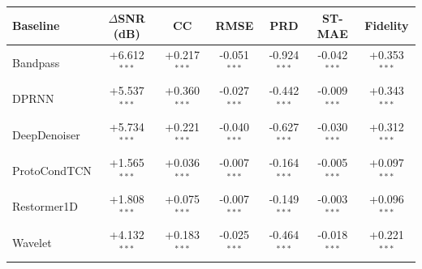 \begin{tabular}{lcccccc}
\toprule
Baseline & $\Delta$SNR (dB) & CC & RMSE & PRD & ST-MAE & Fidelity \\
\midrule
Bandpass & +6.612$^{***}$ & +0.217$^{***}$ & -0.051$^{***}$ & -0.924$^{***}$ & -0.042$^{***}$ & +0.353$^{***}$ \\
DPRNN & +5.537$^{***}$ & +0.360$^{***}$ & -0.027$^{***}$ & -0.442$^{***}$ & -0.009$^{***}$ & +0.343$^{***}$ \\
DeepDenoiser & +5.734$^{***}$ & +0.221$^{***}$ & -0.040$^{***}$ & -0.627$^{***}$ & -0.030$^{***}$ & +0.312$^{***}$ \\
ProtoCondTCN & +1.565$^{***}$ & +0.036$^{***}$ & -0.007$^{***}$ & -0.164$^{***}$ & -0.005$^{***}$ & +0.097$^{***}$ \\
Restormer1D & +1.808$^{***}$ & +0.075$^{***}$ & -0.007$^{***}$ & -0.149$^{***}$ & -0.003$^{***}$ & +0.096$^{***}$ \\
Wavelet & +4.132$^{***}$ & +0.183$^{***}$ & -0.025$^{***}$ & -0.464$^{***}$ & -0.018$^{***}$ & +0.221$^{***}$ \\
\bottomrule
\end{tabular}
